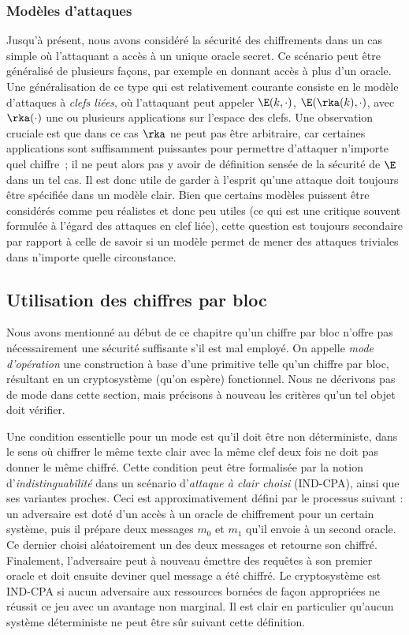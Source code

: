 \subsubsection{Modèles d'attaques}

Jusqu'à présent, nous avons considéré la sécurité des chiffrements dans un cas simple où l'attaquant a accès à un unique oracle secret.
Ce scénario peut être généralisé de plusieurs façons, par exemple en donnant accès à plus d'un oracle. Une généralisation de ce type qui est
relativement courante consiste en le modèle d'attaques à \emph{clefs liées}, où l'attaquant peut appeler
$\E(k,\cdot)$, $\E(\rka(k),\cdot)$, avec $\rka(\cdot)$ une ou plusieurs applications sur l'espace des clefs.
Une observation cruciale est que dans ce cas $\rka$ ne peut pas être arbitraire, car certaines applications sont suffisamment puissantes
pour permettre d'attaquer n'importe quel chiffre~; il ne peut alors pas y avoir de définition sensée de la sécurité de $\E$ dans un tel cas.
Il est donc utile de garder à l'esprit qu'une attaque doit toujours être spécifiée dans un modèle clair. Bien que certains modèles puissent
être considérés comme peu réalistes et donc peu utiles (ce qui est une critique souvent formulée à l'égard des attaques en clef liée), cette
question est toujours secondaire par rapport à celle de savoir si un modèle permet de mener des attaques triviales dans n'importe quelle circonstance. 

\subsection{Utilisation des chiffres par bloc}
\label{sec:cf_modes}

Nous avons mentionné au début de ce chapitre qu'un chiffre par bloc n'offre pas nécessairement une sécurité suffisante s'il est mal employé.
On appelle \emph{mode d'opération} une construction à base d'une primitive telle qu'un chiffre par bloc, résultant en un cryptosystème (qu'on espère) fonctionnel.
Nous ne décrivons pas de mode dans cette section, mais précisons à nouveau les critères qu'un tel objet doit vérifier.

Une condition essentielle pour un mode est qu'il doit être non déterministe, dans le sens où chiffrer le même texte clair avec la même clef deux fois ne
doit pas donner le même chiffré. Cette condition peut être formalisée par la notion d'\emph{indistinguabilité} dans un scénario d'\emph{attaque à clair choisi}
(\textsf{IND-CPA}), ainsi que ses variantes proches. Ceci est approximativement défini par le processus suivant : un adversaire est doté d'un accès
à un oracle de chiffrement pour un certain système, puis il prépare deux messages $m_0$ et $m_1$ qu'il envoie à un second oracle. Ce dernier
choisi aléatoirement un des deux messages et retourne son chiffré. Finalement, l'adversaire peut à nouveau émettre des requêtes à son premier oracle et doit ensuite
deviner quel message a été chiffré. Le cryptosystème est \textsf{IND-CPA} si aucun adversaire aux ressources bornées de façon appropriées ne réussit ce jeu
avec un avantage non marginal. Il est clair en particulier qu'aucun système déterministe ne peut être sûr suivant cette définition. 


